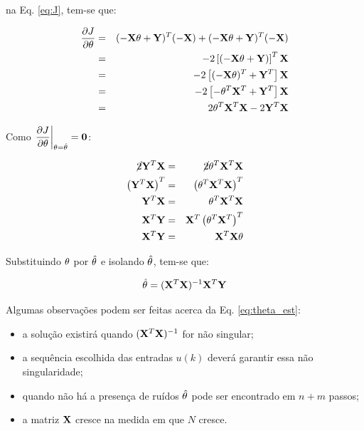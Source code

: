 \noindent na Eq. \ref{eq:J}, tem-se que:

\begin{eqnarray}
\frac{\partial J}{\partial \mathbf{\theta}} & = & 
(-\mathbf{X\theta}+\mathbf{Y})^T(-\mathbf{X}) + (-\mathbf{X\theta}+\mathbf{Y})^T(-\mathbf{X})\nonumber\\
& = & -2 \left[(-\mathbf{X\theta}+\mathbf{Y})\right]^T\mathbf{X}\nonumber\\
& = & -2 \left[(-\mathbf{X\theta})^T + \mathbf{Y}^T\right]\mathbf{X}\nonumber\\
& = & -2 \left[-\mathbf{\theta}^T\mathbf{X}^T + \mathbf{Y}^T\right]\mathbf{X}\nonumber\\
& = & 2 \mathbf{\theta}^T\mathbf{X}^T\mathbf{X} -2 \mathbf{Y}^T\mathbf{X}\label{eq:deduc}
\end{eqnarray}

Como $\left.\displaystyle\frac{\partial J}{\partial \mathbf{\theta}}\right|_{\theta =
\hat{\theta}} = \mathbf{0}$:

\begin{eqnarray}
\cancel{2}\mathbf{Y}^T\mathbf{X} & = & \cancel{2}\mathbf{\theta}^T\mathbf{X}^T\mathbf{X}\nonumber\\
\left(\mathbf{Y}^T\mathbf{X}\right)^T & = & 
\left(\mathbf{\theta}^T\mathbf{X}^T\mathbf{X}\right)^T\nonumber\\
\mathbf{Y}^T\mathbf{X} & = & \mathbf{\theta}^T\mathbf{X}^T\mathbf{X}\nonumber\\
\mathbf{X}^T\mathbf{Y} & = & \mathbf{X}^T\left(\mathbf{\theta}^T\mathbf{X}^T\right)^T\nonumber\\
\mathbf{X}^T\mathbf{Y} & = & \mathbf{X}^T\mathbf{X\theta}\nonumber
\end{eqnarray}

Substituindo $\mathbf{\theta}$ por $\hat{\mathbf{\theta}}$ e isolando
$\hat{\mathbf{\theta}}$, tem-se que:

\begin{equation}\label{eq:theta_est}
\hat{\mathbf{\theta}} = (\mathbf{X}^T\mathbf{X})^{-1} \mathbf{X}^T\mathbf{Y}
\end{equation}

Algumas observações podem ser feitas acerca da Eq. \ref{eq:theta_est}:

\begin{itemize}
    \item a solução existirá quando $(\mathbf{X}^T\mathbf{X})^{-1}$ for não singular;
    \item a sequência escolhida das entradas $u(k)$ deverá garantir essa
          não singularidade;
    \item quando não há a presença de ruídos $\hat{\mathbf{\theta}}$ pode ser
          encontrado em $n+m$ passos;
    \item a matriz $\mathbf{X}$ cresce na medida em que $N$ cresce.
\end{itemize}

